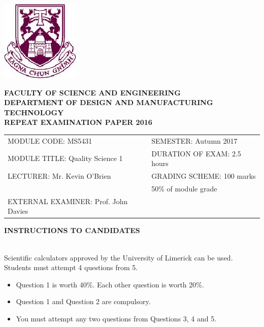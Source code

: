 \documentclass[a4paper,12pt]{article}
\begin{document}
\begin{center}
\includegraphics[scale=0.65]{images/shieldtransparent2}
\end{center}

\begin{center}
\vspace{1cm}
\large \bf {FACULTY OF SCIENCE AND ENGINEERING} \\[0.5cm]
\normalsize DEPARTMENT OF DESIGN AND MANUFACTURING TECHNOLOGY \\[1.25cm]
\large \bf {REPEAT EXAMINATION PAPER 2016} \\[1.5cm]
\end{center}

\begin{tabular}{ll}
MODULE CODE: MS5431 & SEMESTER: Autumn 2017 \\[1cm]
MODULE TITLE: Quality Science 1 & DURATION OF EXAM: 2.5 hours \\[1cm]
LECTURER: Mr. Kevin O'Brien & GRADING SCHEME: 100 marks \\
& \phantom{GRADING Sc} \footnotesize {50\% of module grade} \\[0.8cm]
EXTERNAL EXAMINER: Prof. John Davies & \\
\end{tabular}
\medskip
\begin{center}
{\bf INSTRUCTIONS TO CANDIDATES}
\end{center}
\vspace{-0.4cm}
{\noindent \\ Scientific calculators approved by the University of Limerick can be used. \\
Students must attempt 4 questions from 5.}


\begin{itemize}
	\item Question 1 is worth 40\%. Each other question is worth 20\%.
	\item Question 1 and Question 2 are compulsory.
	\item You must attempt any two questions from Questions 3, 4 and 5.

\end{itemize}
\newpage
\end{document}

